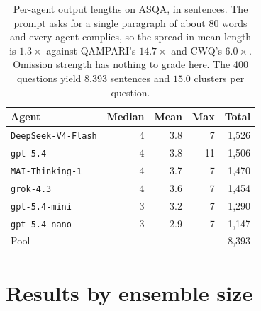 \documentclass{article}
\begin{document}
\begin{table}[H]
  \caption{Per-agent output lengths on ASQA, in sentences. The prompt asks for a single paragraph of about 80 words and every agent complies, so the spread in mean length is $1.3\times$ against QAMPARI's $14.7\times$ and CWQ's $6.0\times$. Omission strength has nothing to grade here. The 400 questions yield 8,393 sentences and $15.0$ clusters per question.}
  \label{tab:asqa-lengths}
  \centering
  \begin{tabular}{lrrrr}
    \toprule
    Agent & Median & Mean & Max & Total \\
    \midrule
    \texttt{DeepSeek-V4-Flash} & 4 & 3.8 &  7 & 1,526 \\
    \texttt{gpt-5.4}           & 4 & 3.8 & 11 & 1,506 \\
    \texttt{MAI-Thinking-1}    & 4 & 3.7 &  7 & 1,470 \\
    \texttt{grok-4.3}          & 4 & 3.6 &  7 & 1,454 \\
    \texttt{gpt-5.4-mini}      & 3 & 3.2 &  7 & 1,290 \\
    \texttt{gpt-5.4-nano}      & 3 & 2.9 &  7 & 1,147 \\
    \midrule
    Pool                       &   &     &    & 8,393 \\
    \bottomrule
  \end{tabular}
\end{table}

\section{Results by ensemble size}
\label{app:ensembles}
\end{document}
